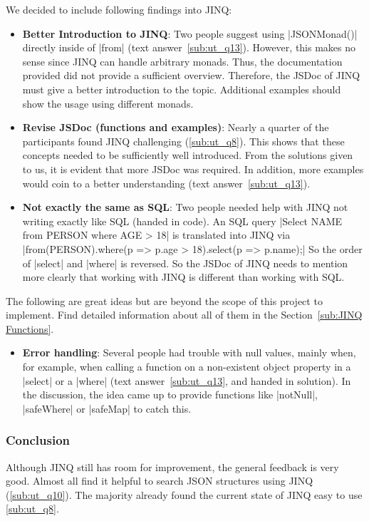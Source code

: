We decided to include following findings into JINQ:
\begin{itemize}
  \item \textbf{Better Introduction to JINQ}: Two people suggest using
    |JSONMonad()| directly inside of |from| (text answer~\ref{sub:ut_q13}).
    However, this makes no sense since JINQ can handle arbitrary monads. Thus,
    the documentation provided did not provide a sufficient overview.
    Therefore, the JSDoc of JINQ must give a better introduction to the topic.
    Additional examples should show the usage using different monads.
  \item \textbf{Revise JSDoc (functions and examples)}: Nearly a quarter of the participants found JINQ
    challenging (\ref{sub:ut_q8}). This shows that these concepts needed to be
    sufficiently well introduced. From the solutions given to us, it is evident
    that more JSDoc was required. In addition, more examples would coin to a
    better understanding (text answer~\ref{sub:ut_q13}).
    \item \textbf{Not exactly the same as SQL}: Two people needed help with
      JINQ not writing exactly like SQL (handed in code). An SQL query
      |Select NAME from PERSON where AGE > 18| is translated into JINQ via
      |from(PERSON).where(p => p.age > 18).select(p => p.name);| So the order
      of |select| and |where| is reversed. So the JSDoc of JINQ needs to
      mention more clearly that working with JINQ is different than working
      with SQL.
\end{itemize}

The following are great ideas but are beyond the scope of this project to
implement. Find detailed information about all of them in the
Section~\ref{sub:JINQ Functions}.
\begin{itemize}
  \item \textbf{Error handling}: Several people had trouble with null values,
    mainly when, for example, when calling a  function on a non-existent object
    property in a |select| or a |where| (text answer~\ref{sub:ut_q13}, and
    handed in solution). In the discussion, the idea came up to
    provide functions like |notNull|, |safeWhere| or |safeMap| to catch this.
\end{itemize}

\subsubsection{Conclusion} %
\label{subsub:Conclusion}
Although JINQ still has room for improvement, the general feedback is very
good. Almost all find it helpful to search JSON structures using JINQ
(\ref{sub:ut_q10}). The majority already found the current state of JINQ easy
to use \ref{sub:ut_q8}.

